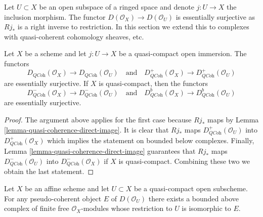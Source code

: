 \noindent
Let $U \subset X$ be an open subspace of a ringed space
and denote $j : U \to X$ the inclusion morphism. The functor
$D(\mathcal{O}_X) \to D(\mathcal{O}_U)$ is essentially surjective as
$Rj_*$ is a right inverse to restriction.
In this section we extend this to complexes with quasi-coherent cohomology
sheaves, etc.

\begin{lemma}
\label{lemma-lift-quasi-coherent}
Let $X$ be a scheme and let $j : U \to X$ be a quasi-compact
open immersion. The functors
$$
D_{\textit{QCoh}}(\mathcal{O}_X) \to D_{\textit{QCoh}}(\mathcal{O}_U)
\quad\text{and}\quad
D^+_{\textit{QCoh}}(\mathcal{O}_X) \to D^+_{\textit{QCoh}}(\mathcal{O}_U)
$$
are essentially surjective. If $X$ is quasi-compact, then the functors
$$
D^-_{\textit{QCoh}}(\mathcal{O}_X) \to D^-_{\textit{QCoh}}(\mathcal{O}_U)
\quad\text{and}\quad
D^b_{\textit{QCoh}}(\mathcal{O}_X) \to D^b_{\textit{QCoh}}(\mathcal{O}_U)
$$
are essentially surjective.
\end{lemma}

\begin{proof}
The argument above applies for the first case because $Rj_*$ maps 
by Lemma \ref{lemma-quasi-coherence-direct-image}.
It is clear that $Rj_*$ maps
$D^+_{\textit{QCoh}}(\mathcal{O}_U)$ into
$D^+_{\textit{QCoh}}(\mathcal{O}_X)$
which implies the statement on bounded below complexes.
Finally, Lemma \ref{lemma-quasi-coherence-direct-image}
guarantees that $Rj_*$ maps
$D^-_{\textit{QCoh}}(\mathcal{O}_U)$ into
$D^-_{\textit{QCoh}}(\mathcal{O}_X)$
if $X$ is quasi-compact. Combining these two we obtain the last statement.
\end{proof}

\begin{lemma}
\label{lemma-lift-pseudo-coherent}
Let $X$ be an affine scheme and let $U \subset X$ be a quasi-compact
open subscheme. For any pseudo-coherent object $E$ of $D(\mathcal{O}_U)$
there exists a bounded above complex of finite free $\mathcal{O}_X$-modules 
whose restriction to $U$ is isomorphic to $E$.
\end{lemma}

